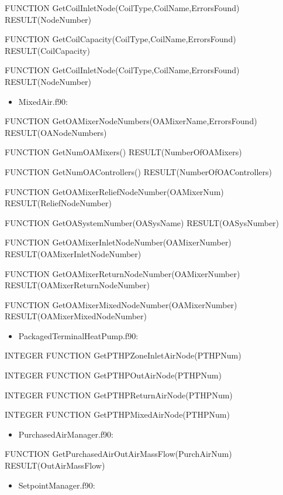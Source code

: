 FUNCTION GetCoilInletNode(CoilType,CoilName,ErrorsFound) RESULT(NodeNumber)

FUNCTION GetCoilCapacity(CoilType,CoilName,ErrorsFound) RESULT(CoilCapacity)

FUNCTION GetCoilInletNode(CoilType,CoilName,ErrorsFound) RESULT(NodeNumber)

\begin{itemize}
\tightlist
\item
  MixedAir.f90:
\end{itemize}

FUNCTION GetOAMixerNodeNumbers(OAMixerName,ErrorsFound) RESULT(OANodeNumbers)

FUNCTION GetNumOAMixers() RESULT(NumberOfOAMixers)

FUNCTION GetNumOAControllers() RESULT(NumberOfOAControllers)

FUNCTION GetOAMixerReliefNodeNumber(OAMixerNum) RESULT(ReliefNodeNumber)

FUNCTION GetOASystemNumber(OASysName) RESULT(OASysNumber)

FUNCTION GetOAMixerInletNodeNumber(OAMixerNumber) RESULT(OAMixerInletNodeNumber)

FUNCTION GetOAMixerReturnNodeNumber(OAMixerNumber) RESULT(OAMixerReturnNodeNumber)

FUNCTION GetOAMixerMixedNodeNumber(OAMixerNumber) RESULT(OAMixerMixedNodeNumber)

\begin{itemize}
\tightlist
\item
  PackagedTerminalHeatPump.f90:
\end{itemize}

INTEGER FUNCTION GetPTHPZoneInletAirNode(PTHPNum)

INTEGER FUNCTION GetPTHPOutAirNode(PTHPNum)

INTEGER FUNCTION GetPTHPReturnAirNode(PTHPNum)

INTEGER FUNCTION GetPTHPMixedAirNode(PTHPNum)

\begin{itemize}
\tightlist
\item
  PurchasedAirManager.f90:
\end{itemize}

FUNCTION GetPurchasedAirOutAirMassFlow(PurchAirNum) RESULT(OutAirMassFlow)

\begin{itemize}
\tightlist
\item
  SetpointManager.f90:
\end{itemize}

